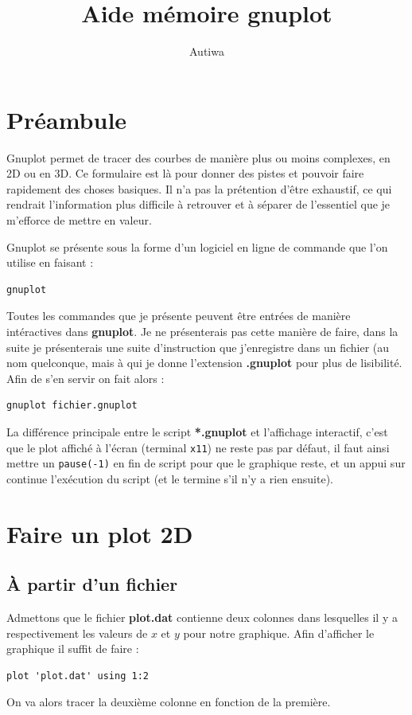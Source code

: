 \documentclass[a4paper,twoside]{article}
\title{Aide mémoire gnuplot}
\author{Autiwa}
\begin{document}
\tableofcontents

\clearpage

\section{Préambule}
Gnuplot permet de tracer des courbes de manière plus ou moins complexes, en 2D ou en 3D. Ce formulaire est là pour donner des pistes et pouvoir faire rapidement des choses basiques. Il n'a pas la prétention d'être exhaustif, ce qui rendrait l'information plus difficile à retrouver et à séparer de l'essentiel que je m'efforce de mettre en valeur. 

Gnuplot se présente sous la forme d'un logiciel en ligne de commande que l'on utilise en faisant : 
\begin{verbatim}
gnuplot
\end{verbatim}

Toutes les commandes que je présente peuvent être entrées de manière intéractives dans \textbf{gnuplot}. Je ne présenterais pas cette manière de faire, dans la suite je présenterais une suite d'instruction que j'enregistre dans un fichier (au nom quelconque, mais à qui je donne l'extension \textbf{.gnuplot} pour plus de lisibilité. Afin de s'en servir on fait alors :
\begin{verbatim}
gnuplot fichier.gnuplot
\end{verbatim}

\begin{remarque}
La différence principale entre le script \textbf{*.gnuplot} et l'affichage interactif, c'est que le plot affiché à l'écran (terminal \texttt{x11}) ne reste pas par défaut, il faut ainsi mettre un \texttt{pause(-1)} en fin de script pour que le graphique reste, et un appui sur  continue l'exécution du script (et le termine s'il n'y a rien ensuite).
\end{remarque}



\section{Faire un plot 2D}
\subsection{À partir d'un fichier}
Admettons que le fichier \textbf{plot.dat} contienne deux colonnes dans lesquelles il y a respectivement les valeurs de $x$ et $y$ pour notre graphique. Afin d'afficher le graphique il suffit de faire : 
\begin{verbatim}
plot 'plot.dat' using 1:2
\end{verbatim}
On va alors tracer la deuxième colonne en fonction de la première.
\end{document}
